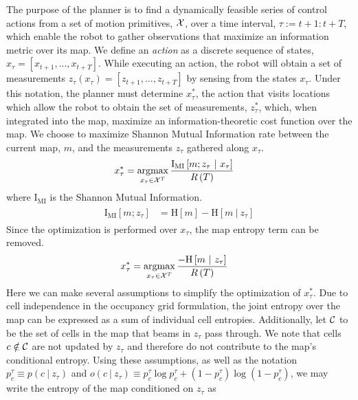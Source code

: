 \documentclass{article}
\begin{document}
The purpose of the planner is to find a dynamically feasible series of control actions from a set of motion primitives, $\mathcal{X}$, over a time interval, $\tau := t+1 : t+T$, which enable the robot to gather observations that maximize an information metric over its map. We define an \textit{action} as a discrete sequence of states, $x_{\tau} = \left[x_{t+1},\dots,x_{t+T}\right]$. While executing an action, the robot will obtain a set of measurements $z_{\tau}(x_{\tau}) = \left[z_{t+1},\dots,z_{t+T}\right]$ by sensing from the states $x_{\tau}$. Under this notation, the planner must determine $x_{\tau}^{*}$, the action that visits locations which allow the robot to obtain the set of measurements, $z_{\tau}^{*}$, which, when integrated into the map, maximize an information-theoretic cost function over the map. We choose to maximize Shannon Mutual Information rate between the current map, $m$, and the measurements $z_{\tau}$ gathered along $x_{\tau}$.
%
\begin{align}
  \begin{split}
    x_{\tau}^{*}
    &=
    \argmax_{x_{\tau} \in \mc{X}^{T}}
    \frac{\text{I}_{\text{MI}}
      \left[
        m
        ;
        z_{\tau}
        \ \vert \
        x_{\tau}
      \right]
    }
    {R\left(T\right)}
  \end{split}
\end{align}
%
where $\text{I}_{\text{MI}}$ is the Shannon Mutual Information.
%
\begin{align}
  \begin{split}
    \text{I}_{\text{MI}}
    \left[
      m
      ;
      z_{\tau}
    \right]
    &=
    \text{H}
    \left[
      m
    \right]
    -
    \text{H}
    \left[
      m
      \ \vert \
      z_{\tau}
    \right]
  \end{split}
\end{align}
%
Since the optimization is performed over $x_{\tau}$, the map entropy term can be removed.
%
\begin{align}
  \begin{split}
    x_{\tau}^{*}
    &=
    \argmax_{x_{\tau} \in \mc{X}^{T}}
    \frac{
      -
      \text{H}
      \left[
        m
        \ \vert \
        z_{\tau}
      \right]
    }
    {
      R
      \left(
      T
      \right)
    }
  \end{split}
\end{align}
%
Here we can make several assumptions to simplify the optimization of $x_{\tau}^{*}$. Due to cell independence in the occupancy grid formulation, the joint entropy over the map can be expressed as a sum of individual cell entropies. Additionally, let $\mathcal{C}$ to be the set of cells in the map that beams in $z_{\tau}$ pass through. We note that cells $c \notin \mathcal{C}$ are not updated by $z_{\tau}$ and therefore do not contribute to the map's conditional entropy. Using these assumptions, as well as the notation $p_c^{\tau} \equiv p(c \ \vert \ z_{\tau})$ and $o(c \ \vert \ z_{\tau}) \equiv p_{c}^{\tau}\log p_{c}^{\tau} + (1 - p_{c}^{\tau})\log (1 - p_{c}^{\tau})$, we may write the entropy of the map conditioned on $z_{\tau}$ as
\end{document}

